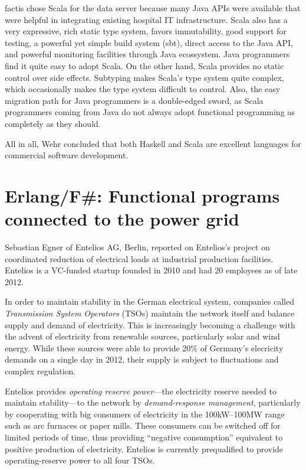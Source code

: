\documentclass{jfp1}
\begin{document}
factis chose Scala for the data server because many Java APIs were
available that were helpful in integrating existing hospital IT
infrastructure.  Scala also has a very expressive, rich static type
system, favors immutability, good support for testing, a powerful yet
simple build system (sbt), direct access to the Java API, and powerful
monitoring facilities through Java ecossystem.  Java programmers find
it quite easy to adopt Scala.  On the other hand, Scala provides no
static control over side effects.  Subtyping makes Scala's type system
quite complex, which occasionally makes the type system difficult to
control.  Also, the easy migration path for Java programmers is a
double-edged sword, as Scala programmers coming from Java do not
always adopt functional programming as completely as they should.

All in all, Wehr concluded that both Haskell and Scala are excellent
languages for commercial software development.

\section{Erlang/F\#: Functional programs connected to the power grid}

Sebastian Egner of Entelios AG, Berlin, reported on Entelios's project
on coordinated reduction of electrical loads at industrial production
facilities.  Entelios is a VC-funded startup founded in 2010 and
had 20 employees as of late 2012.

In order to maintain stability in the German electrical system,
companies called
\textit{Transmission System Operators} (TSOs) maintain the network
itself and balance supply and demand of electricity.
This is increasingly becoming a challenge with the advent of
electricity from renewable sources, particularly solar and wind
energy.  While these sources were able to provide 20\% of Germany's
elecricity demands on a single day in 2012, their supply is subject to
fluctuations and complex regulation.

Entelios provides \textit{operating reserve power}---the electricity
reserve needed to maintain stability---to the network by
\textit{demand-response management}, particularly by cooperating with
big consumers of electricity in the 100kW--100MW range such as arc
furnaces or paper mills.  These consumers can be switched off for
limited periods of time, thus providing ``negative consumption''
equivalent to positive production of electricity.  Entelios is
currently prequalified to provide operating-reserve power to all four
TSOs.
\end{document}
